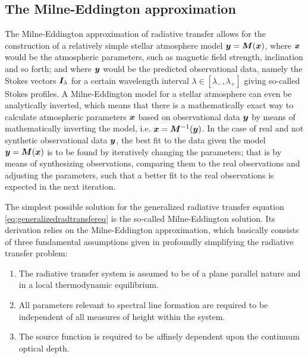 \documentclass[a4paper,12pt]{report}
\begin{document}
\subsection{The Milne-Eddington approximation}\label{sec:MEapproximation}
The Milne-Eddington approximation of radiative transfer allows for the construction of a relatively simple stellar atmosphere model $\bm{y} = \bm{M}(\bm{x})$, where $\bm{x}$ would be the atmospheric parameters, such as  magnetic field strength, inclination and so forth; and where $\bm{y}$ would be the predicted observational data, namely the Stokes vectors $\bm{I}_\lambda$ for a certain wavelength interval $\lambda \in [\lambda_-,\lambda_+]$ giving so-called Stokes profiles. A Milne-Eddington model for a stellar atmosphere can even be analytically inverted, which means that there is a mathematically exact way to calculate atmospheric parameters $\bm{x}$ based on observational data $\bm{y}$ by means of mathematically inverting the model, i.e. $\bm{x} = \bm{M}^{-1}(\bm{y})$. In the case of real and not synthetic observational data $\bm{y}$, the best fit to the data given the model $\bm{y} = \bm{M}(\bm{x})$ is to be found by iteratively changing the parameters; that is by means of synthesizing observations, comparing them to the real observations and adjusting the parameters, such that a better fit to the real observations is expected in the next iteration.

The simplest possible solution for the generalized radiative transfer equation \cref{eq:generalizedradtransfereq} is the so-called Milne-Eddington solution. Its derivation relies on the Milne-Eddington approximation, which basically consists of three fundamental assumptions given in \cite[p.411]{DeglInnocenti.2005} profoundly simplifying the radiative transfer problem:
\begin{enumerate}
\item The radiative transfer system is assumed to be of a plane parallel nature and in a local thermodynamic equilibrium.
\item All parameters relevant to spectral line formation are required to be independent of all measures of height within the system.
\item The source function is required to be affinely dependent upon the continuum optical depth.
\end{enumerate}
\end{document}
